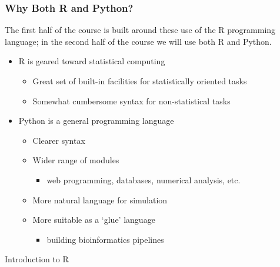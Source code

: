 \documentclass{beamer}
\begin{document}
\begin{frame}
  \frametitle{Why Both R and Python?}

The first half of the course is built around these use of the R programming language; in the second half of the course we will use both R and Python.

\begin{itemize}

\item R is geared toward statistical computing
\begin{itemize}
	\item Great set of built-in facilities for statistically oriented tasks
	\item Somewhat cumbersome syntax for non-statistical tasks
\end{itemize}

\item Python is a general programming language
\begin{itemize}
	\item Clearer syntax
 \item Wider range of modules
		\begin{itemize}
			\item web programming, databases, numerical analysis, etc.
		\end{itemize}
	\item More natural language for simulation
	\item More suitable as a `glue' language
		\begin{itemize}
			\item building bioinformatics pipelines
		\end{itemize}
\end{itemize}

\end{itemize}

\end{frame}


\begin{frame}
  
\begin{center}
\LARGE{Introduction to R}
\end{center}

\end{frame}
\end{document}
